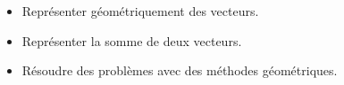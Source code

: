 \documentclass[12pt]{article}
\theoremstyle{break}
\begin{document}
%
%

\begin{savoir}{}{}
  \begin{itemize}
    \item Représenter géométriquement des vecteurs.
    \item Représenter la somme de deux vecteurs.
    \item Résoudre des problèmes avec des méthodes géométriques.
  \end{itemize}
\end{savoir}

\vfill
\end{document}
